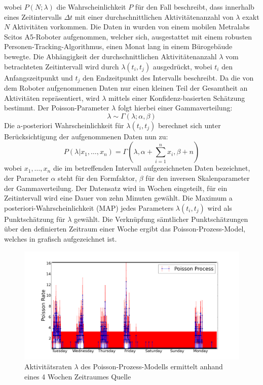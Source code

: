 wobei $P(N;\lambda)$ die Wahrscheinlichkeit $P$ für den Fall beschreibt, dass innerhalb eines Zeitintervalls $\Delta t$ mit einer durchschnittlichen Aktivitätenanzahl von $\lambda$ exakt $N$ Aktivitäten vorkommen. Die Daten in \cite{Jovan.2016} wurden von einem mobilen Metralabs Scitos A5-Roboter aufgenommen, welcher sich, ausgestattet mit einem robusten Personen-Tracking-Algorithmus, einen Monat lang in einem Bürogebäude bewegte. Die Abhängigkeit der durchschnittlichen Aktivitätenanzahl $\lambda$ vom betrachteten Zeitintervall wird durch $\lambda (t_i, t_j)$ ausgedrückt, wobei  $t_i$ den Anfangszeitpunkt und $t_j$ den Endzeitpunkt des Intervalls beschreibt. Da die von dem Roboter aufgenommenen Daten nur einen kleinen Teil der Gesamtheit an Aktivitäten repräsentiert, wird $\lambda$ mittels einer Konfidenz-basierten Schätzung bestimmt. Der Poisson-Parameter $\lambda$ folgt hierbei einer Gammaverteilung:
\begin{equation}
	\lambda \sim \Gamma(\lambda ; \alpha, \beta)
\end{equation}
Die a-posteriori Wahrscheinlichkeit für $\lambda (t_i, t_j)$ berechnet sich unter Berücksichtigung der aufgenommenen Daten nun zu:
\begin{equation}
	P(\lambda | x_1, \dots, x_n) = \Gamma(\lambda, \alpha + \sum_{i=1}^{n} x_i, \beta +n)
\end{equation}
wobei $x_1, \dots , x_n$ die im betreffenden Intervall aufgezeichneten Daten bezeichnet, der Parameter $\alpha$ steht für den Formfaktor, $\beta$ für den inversen Skalenparameter der Gammaverteilung.
Der Datensatz wird in Wochen eingeteilt, für ein Zeitintervall wird eine Dauer von zehn Minuten gewählt. Die Maximum a posteriori-Wahrscheinlichkeit (MAP) jedes Parameters $\lambda(t_i, t_j)$ wird als Punktschätzung für $\lambda$ gewählt. Die Verknüpfung sämtlicher Punktschätzungen über den definierten Zeitraum einer Woche ergibt das Poisson-Prozess-Model, welches in  grafisch aufgezeichnet ist. 
\begin{figure}[!ht]
	\begin{center}
		\includegraphics[width=0.7\linewidth]{Abbildungen/stand_der_technik/poisson-prozess-model1}
		\caption{Aktivitätsraten $\lambda$ des Poisson-Prozess-Modells ermittelt anhand eines 4 Wochen Zeitraumes Quelle \cite{Jovan.2016}}
		\label{fig.poisson-prozess-model1}
	\end{center}
\end{figure}

